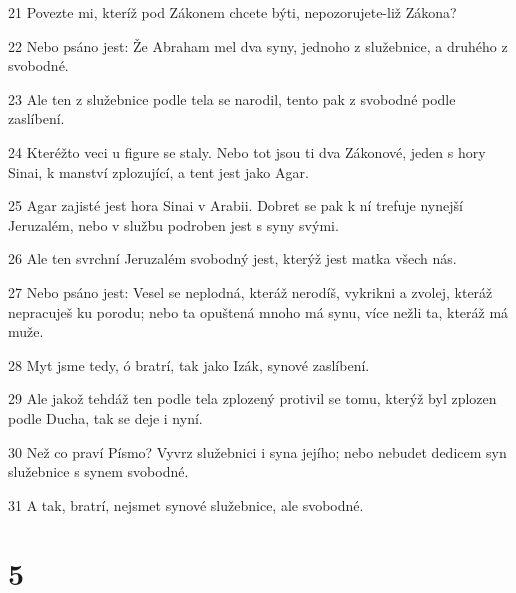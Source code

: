 \par 21 Povezte mi, kteríž pod Zákonem chcete býti, nepozorujete-liž Zákona?
\par 22 Nebo psáno jest: Že Abraham mel dva syny, jednoho z služebnice, a druhého z svobodné.
\par 23 Ale ten z služebnice podle tela se narodil, tento pak z svobodné podle zaslíbení.
\par 24 Kteréžto veci u figure se staly. Nebo tot jsou ti dva Zákonové, jeden s hory Sinai, k manství zplozující, a tent jest jako Agar.
\par 25 Agar zajisté jest hora Sinai v Arabii. Dobret se pak k ní trefuje nynejší Jeruzalém, nebo v službu podroben jest s syny svými.
\par 26 Ale ten svrchní Jeruzalém svobodný jest, kterýž jest matka všech nás.
\par 27 Nebo psáno jest: Vesel se neplodná, kteráž nerodíš, vykrikni a zvolej, kteráž nepracuješ ku porodu; nebo ta opuštená mnoho má synu, více nežli ta, kteráž má muže.
\par 28 Myt jsme tedy, ó bratrí, tak jako Izák, synové zaslíbení.
\par 29 Ale jakož tehdáž ten podle tela zplozený protivil se tomu, kterýž byl zplozen podle Ducha, tak se deje i nyní.
\par 30 Než co praví Písmo? Vyvrz služebnici i syna jejího; nebo nebudet dedicem syn služebnice s synem svobodné.
\par 31 A tak, bratrí, nejsmet synové služebnice, ale svobodné.

\chapter{5}

